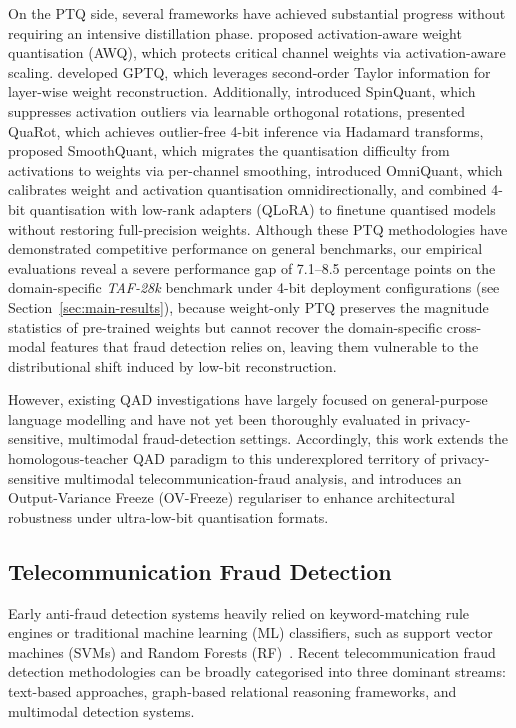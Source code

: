 \documentclass[a4paper,fleqn]{cas-sc}
\begin{document}
On the PTQ side, several frameworks have achieved substantial progress without requiring an intensive distillation phase. \citet{9} proposed activation-aware weight quantisation (AWQ), which protects critical channel weights via activation-aware scaling. \citet{10} developed GPTQ, which leverages second-order Taylor information for layer-wise weight reconstruction. Additionally, \citet{11} introduced SpinQuant, which suppresses activation outliers via learnable orthogonal rotations, \citet{12} presented QuaRot, which achieves outlier-free 4-bit inference via Hadamard transforms, \citet{xiao2023smoothquant} proposed SmoothQuant, which migrates the quantisation difficulty from activations to weights via per-channel smoothing, \citet{shao2024omniquant} introduced OmniQuant, which calibrates weight and activation quantisation omnidirectionally, and \citet{dettmers2023qlora} combined 4-bit quantisation with low-rank adapters (QLoRA) to finetune quantised models without restoring full-precision weights. Although these PTQ methodologies have demonstrated competitive performance on general benchmarks, our empirical evaluations reveal a severe performance gap of 7.1--8.5 percentage points on the domain-specific \textit{TAF-28k} benchmark under 4-bit deployment configurations (see Section~\ref{sec:main-results}), because weight-only PTQ preserves the magnitude statistics of pre-trained weights but cannot recover the domain-specific cross-modal features that fraud detection relies on, leaving them vulnerable to the distributional shift induced by low-bit reconstruction.

However, existing QAD investigations have largely focused on general-purpose language modelling and have not yet been thoroughly evaluated in privacy-sensitive, multimodal fraud-detection settings. Accordingly, this work extends the homologous-teacher QAD paradigm to this underexplored territory of privacy-sensitive multimodal telecommunication-fraud analysis, and introduces an Output-Variance Freeze (OV-Freeze) regulariser to enhance architectural robustness under ultra-low-bit quantisation formats.

\subsection{Telecommunication Fraud Detection}

Early anti-fraud detection systems heavily relied on keyword-matching rule engines or traditional machine learning (ML) classifiers, such as support vector machines (SVMs) and Random Forests (RF)~\citep{13,14,15}. Recent telecommunication fraud detection methodologies can be broadly categorised into three dominant streams: text-based approaches, graph-based relational reasoning frameworks, and multimodal detection systems.
\end{document}
